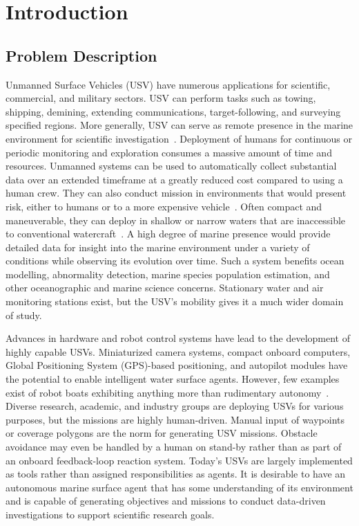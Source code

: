 \documentclass{tamuccthesis}
\begin{document}
\setlength{\headheight}{12pt}

\chapter{Introduction}

\section{Problem Description}

Unmanned Surface Vehicles (USV) have numerous applications for scientific, commercial, and military sectors. USV can perform tasks such as towing, shipping, demining, extending communications, target-following, and surveying specified regions. More generally, USV can serve as remote presence in the marine environment for scientific investigation~\cite{manley2008unmanned}. Deployment of humans for continuous or periodic monitoring and exploration consumes a massive amount of time and resources. Unmanned systems can be used to automatically collect substantial data over an extended timeframe at a greatly reduced cost compared to using a human crew. They can also conduct mission in environments that would present risk, either to humans or to a more expensive vehicle~\cite{liu:2016}. Often compact and maneuverable, they can deploy in shallow or narrow waters that are inaccessible to conventional watercraft~\cite{liu:2016}. A high degree of marine presence would provide detailed data for insight into the marine environment under a variety of conditions while observing its evolution over time. Such a system benefits ocean modelling, abnormality detection, marine species population estimation, and other oceanographic and marine science concerns. Stationary water and air monitoring stations exist, but the USV's mobility gives it a much wider domain of study. 

Advances in hardware and robot control systems have lead to the development of highly capable USVs. Miniaturized camera systems, compact onboard computers,  Global Positioning System (GPS)-based positioning, and autopilot modules have the potential to enable intelligent water surface agents. However, few examples exist of robot boats exhibiting anything more than rudimentary autonomy~\cite{bertram2008unmanned, liu:2016}. Diverse research, academic, and industry groups are deploying USVs for various purposes, but the missions are highly human-driven. Manual input of waypoints or coverage polygons are the norm for generating USV missions. Obstacle avoidance may even be handled by a human on stand-by rather than as part of an onboard feedback-loop reaction system. Today's USVs are largely implemented as tools rather than assigned responsibilities as agents. It is desirable to have an autonomous marine surface agent that has some understanding of its environment and is capable of generating objectives and missions to conduct data-driven investigations to support scientific research goals.
\end{document}
